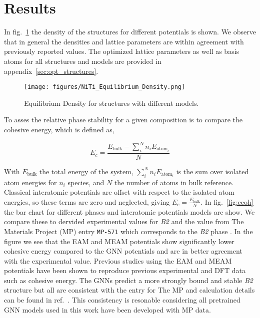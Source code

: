 \documentclass[preprint,colorlinks=true,linkcolor=black,citecolor=black]{elsarticle}
\begin{document}

\section{Results}
\label{sec:results}

In fig.~\ref{fig:opt_density} the density of the structures for
different potentials is shown. We observe that in general the
densities and lattice parameters are within agreement with previously
reported values. The optimized lattice parameters as well as basis
atoms for all structures and models are provided in
appendix~\ref{sec:opt_structures}. \par

\begin{figure}[ht!]
	\label{fig:opt_density}
	\centering
	\texttt{[image: figures/NiTi\_Equilibrium\_Density.png]}
	\caption{Equilibrium Density for  structures with different
		models.}
\end{figure}

To asses the relative phase stability for a given composition is to
compare the cohesive energy, which is defined as,

\begin{equation}
	\label{eq:cohesive_energy}
	E_{c} = \frac{E_{\text{bulk}} - \sum_{i}^{N} n_i E_{\text{atom}_i}}{N}
\end{equation}

With $E_{\text{bulk}}$ the total energy of the system,
$\sum_i^N n_i E_{\text{atom}_i}$ is the sum over isolated atom
energies for $n_i$ species, and $N$ the number of atoms in bulk
reference. Classical interatomic potentials are offset with respect to
the isolated atom energies, so these terms are zero and neglected,
giving $E_{c} = \frac{E_{\text{bulk}}}{N}$. In fig.~\ref{fig:ecoh} the
bar chart for different phases and interatomic potentials models are
show. We compare these to dervided experimental values for
\textit{B2}\cite{Vandermause2024} and the value from The Materials
Project (MP) entry \texttt{MP-571} which corresponds to the
\textit{B2} phase \cite{MP--571}. In the figure we see that the EAM
and MEAM potentials show significantly lower cohesive energy compared
to the GNN potentials and are in better agreement with the
experimental value. Previous studies using the EAM and MEAM potentials
have been shown to reproduce previous experimental and DFT data
\cite{Haskins2016,Ko2015} such as cohesive energy. The GNNs predict a
more strongly bound and stable \textit{B2} structure but all are
consistent with the entry for The MP and calculation details can be
found in ref.~\cite{MP--571}. This consistency is resonable
considering all pretrained GNN models used in this work have been
developed with MP data. \par
\end{document}

